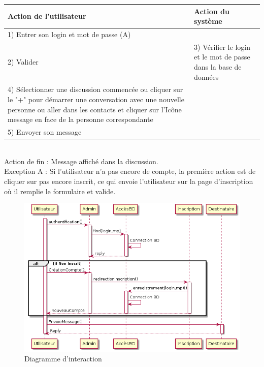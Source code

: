 	\begin{tabular}{|p{7cm}|p{7cm}|}
		\hline
		Action de l'utilisateur & Action du système\tabularnewline
		\hline

		\hline
		1) Entrer son login et mot de passe (A)  & \tabularnewline

		\hline
		2) Valider  & 3) Vérifier le login et le mot de passe dans la base de données\tabularnewline

		\hline
		4) Sélectionner une discussion commencée ou cliquer sur le "+" pour	démarrer une conversation avec une nouvelle personne ou aller dans les contacts et cliquer sur l’Icône message en face de la personne correspondante & \tabularnewline

		\hline
		5) Envoyer son message  & \tabularnewline
		\hline
	\end{tabular}

~\\

	Action de fin  : Message affiché dans la discussion. \\

	Exception A : Si l'utilisateur n'a pas encore de compte, la première action est de cliquer sur pas encore inscrit, ce qui envoie l'utilisateur sur la page d'inscription où il remplie le formulaire et valide.

	\begin{figure}[H]
		\centerline{\includegraphics[width=12.5cm]{img/interaction.png}}
		\caption{Diagramme d’interaction}
	\end{figure}

	\newpage

